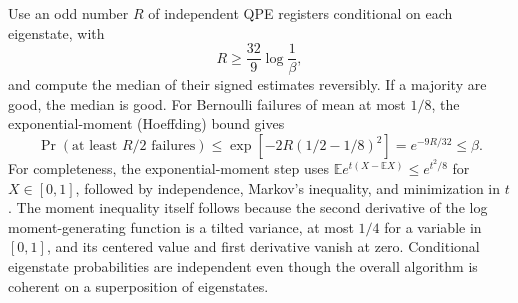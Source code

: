 Use an odd number $R$ of independent QPE registers conditional on each eigenstate, with
\begin{equation}
 R\geq\frac{32}{9}\log\frac1\beta,
\end{equation}
and compute the median of their signed estimates reversibly. If a majority are good, the median is good. For Bernoulli failures of mean at most $1/8$, the exponential-moment (Hoeffding) bound gives
\begin{equation}
 \Pr(\text{at least }R/2\text{ failures})
 \leq\exp[-2R(1/2-1/8)^2]=e^{-9R/32}\leq\beta.
\end{equation}
For completeness, the exponential-moment step uses $\mathbb E e^{t(X-\mathbb EX)}\leq e^{t^2/8}$ for $X\in[0,1]$, followed by independence, Markov's inequality, and minimization in $t$. The moment inequality itself follows because the second derivative of the log moment-generating function is a tilted variance, at most $1/4$ for a variable in $[0,1]$, and its centered value and first derivative vanish at zero. Conditional eigenstate probabilities are independent even though the overall algorithm is coherent on a superposition of eigenstates.

